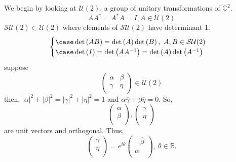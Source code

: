 \documentclass{article}
\begin{document}
We begin by looking at $\mathcal{U}(2)$, a group of unitary transformations of $\mathbb{C}^{2}$. 
\begin{equation}
    A A^{*} = A^{*}A = I, A \in \mathcal{U}(2)
\end{equation}
$\mathcal{SU}(2) \subset \mathcal{U}(2)$ where elements of $\mathcal{SU}(2)$ have determinant 1. 
\begin{equation}
    \begin{cases}
        \case \det\left( AB \right) = \det\left( A \right) \det\left( B \right), \ A,B \in \mathcal{SU}(2) \\
        \case \det\left( I \right) = \det\left( A A^{-1} \right) = \det\left( A \right) \det\left( A^{-1} \right)
    \end{cases}
\end{equation}
suppose 
\begin{equation}
    \begin{pmatrix}
        \alpha & \beta \\
        \gamma & \eta \\
    \end{pmatrix} \in \mathcal{U}(2)
\end{equation}
then, $| \alpha |^{2} + | \beta |^{2} = | \gamma |^{2} + | \eta |^{2} = 1$ and $\alpha \overline{\gamma} + \beta \overline{\eta} = 0$. So,
\begin{equation}
    \begin{pmatrix}
        \alpha \\ \beta \\
    \end{pmatrix},
    \begin{pmatrix}
        \gamma \\ \eta \\
    \end{pmatrix}
\end{equation}
are unit vectors and orthogonal. Thus, 
\begin{equation}
    \begin{pmatrix}
        \gamma \\ \eta \\
    \end{pmatrix}
    = e^{i\theta}
    \begin{pmatrix}
        -\overline{\beta} \\ \overline{\alpha} \\
    \end{pmatrix},
    \ \theta \in \mathbb{R}.
\end{equation}
\end{document}
